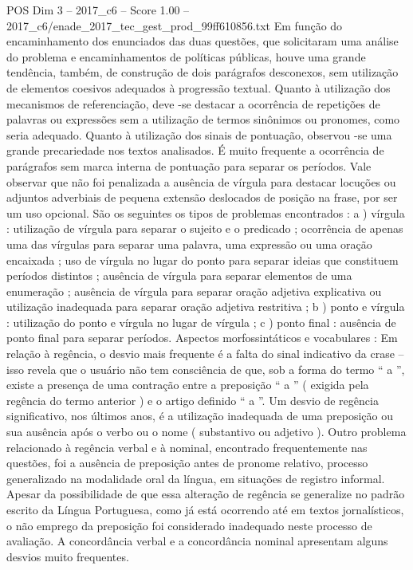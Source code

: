 \begin{textsample}{POS Dim 3 – 2017\_c6 – Score 1.00 – 2017\_c6/enade\_2017\_tec\_gest\_prod\_99ff610856.txt}
Em função do encaminhamento dos enunciados das duas questões, que solicitaram uma análise do problema e encaminhamentos de políticas públicas, houve uma grande tendência, também, de construção de dois parágrafos desconexos, sem utilização de elementos coesivos adequados à progressão textual.
Quanto à utilização dos mecanismos de referenciação, deve -se destacar a ocorrência de repetições de palavras ou expressões sem a utilização de termos sinônimos ou pronomes, como seria adequado.
Quanto à utilização dos sinais de pontuação, observou -se uma grande precariedade nos textos analisados.
É muito frequente a ocorrência de parágrafos sem marca interna de pontuação para separar os períodos.
Vale observar que não foi penalizada a ausência de vírgula para destacar locuções ou adjuntos adverbiais de pequena extensão deslocados de posição na frase, por ser um uso opcional.
São os seguintes os tipos de problemas encontrados : a ) vírgula : utilização de vírgula para separar o sujeito e o predicado ; ocorrência de apenas uma das vírgulas para separar uma palavra, uma expressão ou uma oração encaixada ; uso de vírgula no lugar do ponto para separar ideias que constituem períodos distintos ; ausência de vírgula para separar elementos de uma enumeração ; ausência de vírgula para separar oração adjetiva explicativa ou utilização inadequada para separar oração adjetiva restritiva ; b ) ponto e vírgula : utilização do ponto e vírgula no lugar de vírgula ; c ) ponto final : ausência de ponto final para separar períodos.
Aspectos morfossintáticos e vocabulares : Em relação à regência, o desvio mais frequente é a falta do sinal indicativo da crase – isso revela que o usuário não tem consciência de que, sob a forma do termo “ a ”, existe a presença de uma contração entre a preposição “ a ” ( exigida pela regência do termo anterior ) e o artigo definido “ a ”.
Um desvio de regência significativo, nos últimos anos, é a utilização inadequada de uma preposição ou sua ausência após o verbo ou o nome ( substantivo ou adjetivo ).
Outro problema relacionado à regência verbal e à nominal, encontrado frequentemente nas questões, foi a ausência de preposição antes de pronome relativo, processo generalizado na modalidade oral da língua, em situações de registro informal.
Apesar da possibilidade de que essa alteração de regência se generalize no padrão escrito da Língua Portuguesa, como já está ocorrendo até em textos jornalísticos, o não emprego da preposição foi considerado inadequado neste processo de avaliação.
A concordância verbal e a concordância nominal apresentam alguns desvios muito frequentes.

\end{textsample}
